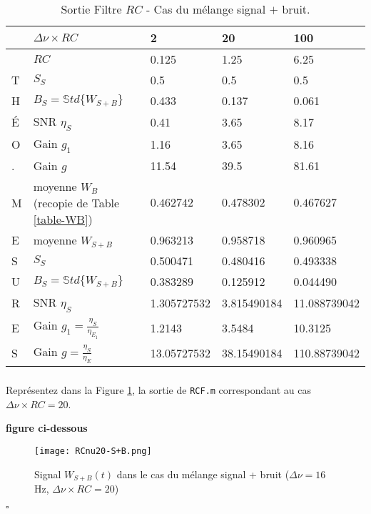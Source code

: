 \documentclass{article}
\newcommand{\debutrep}[1]{\color{blue}\begin{center} \hrulefill \textbf{ #1 } \hrulefill \end{center} }
\newcommand{\finrep}{\vspace*{5mm}\hfill $\square$\color{black}\vspace*{5mm}}
\begin{document}
\begin{table}[H]
\begin{tabular}{|L{6mm}| L{40mm} | C{35mm} | C{35mm} | C{35mm} |}\hline
	& $\Delta\nu \times RC$ 		& 2 	& 20 	& 100 \\[5mm]  \hline
	& $RC$ 					
 & 	0.125
 &	1.25
 &	6.25
 \\[5mm]  \hline \hline
T	& $S_S$ 					
&	0.5
&	0.5
&	0.5
\\[5mm]   %
H	& $B_S=\mathbb{S}td\{W_{S+B}\}$ 
&	0.433
&	0.137
&	0.061
\\[5mm]   %
É	& SNR $\eta_S$				
&	0.41
&	3.65
&	8.17
\\[5mm]   %
O	& Gain $g_1$				
&	1.16
&   3.65
&	8.16
\\[5mm]  %
. 	& Gain $g$ 				
&	11.54
&	39.5
&	81.61
\\[5mm]  \hline\hline
M 	& moyenne $W_B$ \newline 
(recopie de Table \ref{table-WB}) 		
& $0.462742$	
& $0.478302$	
& $0.467627$	
\\[5mm]   %
E 	& moyenne $W_{S+B}$  		
&	0.963213
&	0.958718
& 	0.960965
\\[5mm]   %
S 	& $S_S$ 					
&	0.500471
&	0.480416
&	0.493338
\\[5mm]   %
U 	& $B_S=\mathbb{S}td\{W_{S+B}\}$ 
&	0.383289
&	0.125912
&	0.044490
\\[5mm]   %
R 	& SNR $\eta_S$ 				
&	1.305727532
&	3.815490184
&	11.088739042
\\[5mm]   %
E
&   Gain $g_1 = \frac{\eta _S}{\eta _E_1}$ 				
&   1.2143
&	3.5484
&	10.3125
\\[5mm]   %
S 	& Gain $g = \frac{\eta _S}{\eta _E}$ 				
&	13.05727532
&	38.15490184
&	110.88739042
\\[5mm]  \hline\hline
\end{tabular}
\caption{Sortie Filtre $RC$ - Cas du mélange signal $+$ bruit.}
\label{table-WSB}
\end{table}


\subsubsection{}

Représentez dans la Figure \ref{fig-Wsb}, la sortie de {\tt RCF.m} correspondant au cas  $\Delta\nu \times RC = 20$.

\debutrep{figure ci-dessous}
\begin{figure}[H]
\texttt{[image: RCnu20-S+B.png]}
\caption{Signal $W_{S+B}(t)$ dans le cas du mélange signal + bruit ($\Delta \nu = 16$ Hz, $\Delta\nu \times RC = 20$)}
\label{fig-Wsb}
\end{figure}
\finrep
\end{document}
